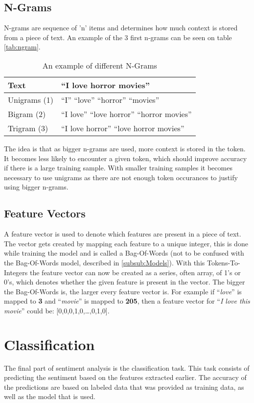 \subsection{N-Grams}
N-grams are sequence of 'n' items and determines how much context is stored
from a piece of text. An example of the 3 first n-grams can be seen on table
\autoref{tab:ngram}. 

\begin{table}[H]
\centering
\begin{tabular}{|l|l|}
\hline
Text & ``I love horror movies'' \\ \hline
Unigrams (1) &
``I'' ``love'' ``horror'' ``movies''
\\ \hline 
Bigram (2) &
``I love'' ``love horror'' ``horror movies''
\\ \hline
Trigram (3) &
``I love horror'' ``love horror movies''
\\ \hline
\end{tabular}
\caption{An example of different N-Grams}
\label{tab:ngram}
\end{table}

The idea is that as bigger n-grams are used, more context is stored in the
token. It becomes less likely to encounter a given token, which should
improve accuracy if there is a large training sample. With smaller training
samples it becomes necessary to use unigrams as there are not enough
token occurances to justify using bigger n-grams.

\subsection{Feature Vectors}
A feature vector is used to denote which features are present in a piece of
text. The vector gets created by mapping each feature to a unique integer, this
is done while training the model and is called a Bag-Of-Words (not to be
confused with the Bag-Of-Words model, described in \autoref{subsub:Models}).
With this Tokens-To-Integers the feature vector can now be created as a series,
often array, of 1's or 0's, which denotes whether the given feature is present
in the vector. The bigger the Bag-Of-Words is, the larger every feature vector
is. For example if ``\textit{love}'' is mapped to \textbf{3} and
``\textit{movie}'' is mapped to \textbf{205}, then a feature vector for
``\textit{I love this movie}'' could be: [0,0,0,1,0,\ldots,0,1,0].



\section{Classification}
The final part of sentiment analysis is the classification task. This task
consists of predicting the sentiment based on the features extracted earlier.
The accuracy of the predictions are based on labeled data that was provided as
training data, as well as the model that is used. 

